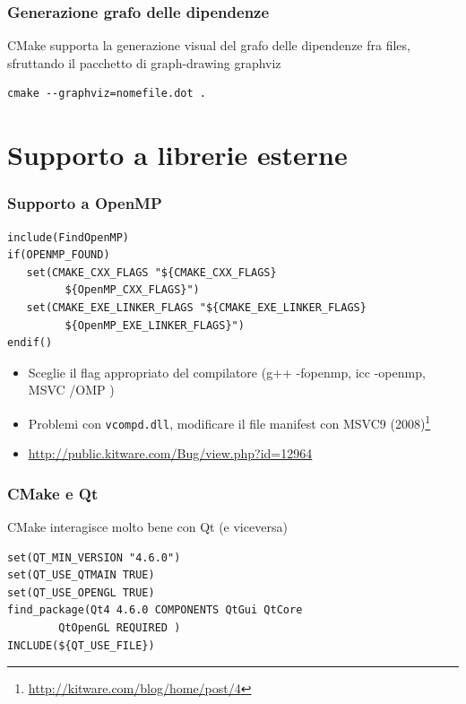 \documentclass[10pt] {beamer}
\begin{document}
\begin{frame}[fragile]
 \frametitle{Generazione grafo delle dipendenze}
CMake supporta la generazione visual del grafo delle dipendenze fra files, sfruttando il pacchetto di graph-drawing graphviz
\begin{verbatim}
cmake --graphviz=nomefile.dot .

\end{verbatim}

\end{frame}



\section{Supporto a librerie esterne}
\begin{frame}[fragile]
 \frametitle{Supporto a OpenMP}
\begin{footnotesize}
\begin{verbatim}
include(FindOpenMP)
if(OPENMP_FOUND)
   set(CMAKE_CXX_FLAGS "${CMAKE_CXX_FLAGS} 
         ${OpenMP_CXX_FLAGS}")
   set(CMAKE_EXE_LINKER_FLAGS "${CMAKE_EXE_LINKER_FLAGS} 
         ${OpenMP_EXE_LINKER_FLAGS}")
endif()
\end{verbatim}
\end{footnotesize}
\begin{itemize}
 \item Sceglie il flag appropriato del compilatore (g++ -fopenmp, icc -openmp, MSVC /OMP )
 \item Problemi con \texttt{vcompd.dll}, modificare il file manifest con MSVC9 (2008)\footnote{\url{http://kitware.com/blog/home/post/4}}
\item \url{http://public.kitware.com/Bug/view.php?id=12964}
\end{itemize}

\end{frame}


\begin{frame}[fragile]
\frametitle{CMake e Qt}
CMake interagisce molto bene con Qt (e viceversa)
\begin{footnotesize}
\begin{verbatim}
set(QT_MIN_VERSION "4.6.0")
set(QT_USE_QTMAIN TRUE)
set(QT_USE_OPENGL TRUE)
find_package(Qt4 4.6.0 COMPONENTS QtGui QtCore 
	    QtOpenGL REQUIRED )
INCLUDE(${QT_USE_FILE})
\end{verbatim}
\end{footnotesize}
\end{frame}
\end{document}
